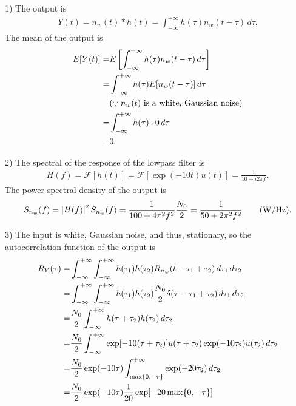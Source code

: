 \documentclass{assignment}
\begin{document}
\begin{sol}
    \item[1)] The output is
    \begin{align}
        Y(t)=n_w(t)*h(t)=\int_{-\infty}^{+\infty}h(\tau)n_w(t-\tau)\,d\tau.
    \end{align}
    The mean of the output is
    \begin{align}
        \notag E[Y(t)]=&E\left[\int_{-\infty}^{+\infty}h(\tau)n_w(t-\tau)\,d\tau\right]\\
        \notag=&\int_{-\infty}^{+\infty}h(\tau)E[n_w(t-\tau)]\,d\tau\\
        \notag&(\because n_w(t)\text{ is a white, Gaussian noise})\\
        \notag=&\int_{-\infty}^{+\infty}h(\tau)\cdot 0\,d\tau\\
        =&0.
    \end{align}
    \item[2)] The spectral of the response of the lowpass filter is
    \begin{align}
        H(f)=\mathscr{F}[h(t)]=\mathscr{F}[\exp(-10t)u(t)]=\frac{1}{10+i2\pi f}.
    \end{align}
    The power spectral density of the output is
    \begin{align}
        S_{n_w}(f)=\left\lvert H(f)\right\rvert^2S_{n_w}(f)=\frac{1}{100+4\pi^2f^2}\frac{N_0}{2}=\frac{1}{50+2\pi^2f^2}\qquad(\text{W/Hz}).
    \end{align}
    \item[3)] The input is white, Gaussian noise, and thus, stationary, so the autocorrelation function of the output is
    \begin{align}
        \notag R_Y(\tau)=&\int_{-\infty}^{+\infty}\int_{-\infty}^{+\infty}h(\tau_1)h(\tau_2)R_{n_w}(t-\tau_1+\tau_2)\,d\tau_1\,d\tau_2\\
        \notag=&\int_{-\infty}^{+\infty}\int_{-\infty}^{+\infty}h(\tau_1)h(\tau_2)\frac{N_0}{2}\delta(\tau-\tau_1+\tau_2)\,d\tau_1\,d\tau_2\\
        \notag=&\frac{N_0}{2}\int_{-\infty}^{+\infty}h(\tau+\tau_2)h(\tau_2)\,d\tau_2\\
        \notag=&\frac{N_0}{2}\int_{-\infty}^{+\infty}\exp[-10(\tau+\tau_2)]u(\tau+\tau_2)\exp(-10\tau_2)u(\tau_2)\,d\tau_2\\
        \notag=&\frac{N_0}{2}\exp(-10\tau)\int_{\max\{0,-\tau\}}^{+\infty}\exp(-20\tau_2)\,d\tau_2\\
        \notag=&\frac{N_0}{2}\exp(-10\tau)\frac{1}{20}\exp[-20\max\{0,-\tau\}]\\

\end{align}
\end{sol}
\end{document}
